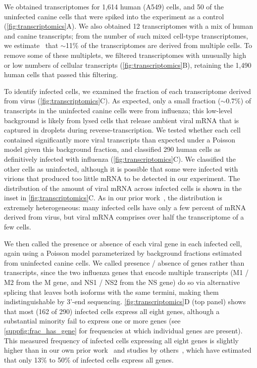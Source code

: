 \documentclass[10pt,letterpaper]{article}
\newcommand{\FIG}[1]{\autoref{fig:#1}}
\newcommand{\SUPPFIG}[1]{\autoref{suppfig:#1}}
\begin{document}
We obtained transcriptomes for 1,614 human (A549) cells, and 50 of the uninfected canine cells that were spiked into the experiment as a control (\FIG{transcriptomics}A).
We also obtained 12 transcriptomes with a mix of human and canine transcripts; from the number of such mixed cell-type transcriptomes, we estimate~\cite{bloom2018estimating} that $\sim$11\% of the transcriptomes are derived from multiple cells.
To remove some of these multiplets, we filtered transcriptomes with unusually high or low numbers of cellular transcripts (\FIG{transcriptomics}B), retaining the 1,490 human cells that passed this filtering.

To identify infected cells, we examined the fraction of each transcriptome derived from virus (\FIG{transcriptomics}C).
As expected, only a small fraction ($\sim$0.7\%) of transcripts in the uninfected canine cells were from influenza; this low-level background is likely from lysed cells that release ambient viral mRNA that is captured in droplets during reverse-transcription.
We tested whether each cell contained significantly more viral transcripts than expected under a Poisson model given this background fraction, and classified 290 human cells as definitively infected with influenza (\FIG{transcriptomics}C).
We classified the other cells as uninfected, although it is possible that some were infected with virions that produced too little mRNA to be detected in our experiment.
The distribution of the amount of viral mRNA across infected cells is shown in the inset in \FIG{transcriptomics}C.
As in our prior work~\cite{russell2018extreme}, the distribution is extremely heterogeneous: many infected cells have only a few percent of mRNA derived from virus, but viral mRNA comprises over half the transcriptome of a few cells.

We then called the presence or absence of each viral gene in each infected cell, again using a Poisson model parameterized by background fractions estimated from uninfected canine cells.
We called presence / absence of genes rather than transcripts, since the two influenza genes that encode multiple transcripts (M1 / M2 from the M gene, and NS1 / NS2 from the NS gene) do so via alternative splicing that leaves both isoforms with the same termini, making them indistinguishable by 3'-end sequencing.
\FIG{transcriptomics}D (top panel) shows that most (162 of 290) infected cells express all eight genes, although a substantial minority fail to express one or more genes (see \SUPPFIG{frac_has_gene} for frequencies at which individual genes are present).
This measured frequency of infected cells expressing all eight genes is slightly higher than in our own prior work~\cite{russell2018extreme} and studies by others~\cite{brooke2013most, heldt2015single, dou2017analysis}, which have estimated that only 13\% to 50\% of infected cells express all genes. 
\end{document}
